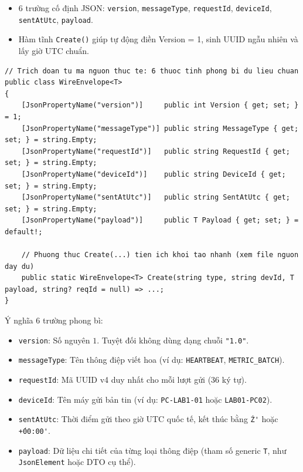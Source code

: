 \documentclass[12pt,a4paper]{article}
\begin{document}
\begin{orientationbox}
\begin{itemize}[leftmargin=1.5em, itemsep=1pt]
  \item 6 trường cố định JSON: \texttt{version}, \texttt{messageType}, \texttt{requestId}, \texttt{deviceId}, \texttt{sentAtUtc}, \texttt{payload}.
  \item Hàm tĩnh \texttt{Create()} giúp tự động điền Version = 1, sinh UUID ngẫu nhiên và lấy giờ UTC chuẩn.
\end{itemize}
\end{orientationbox}

\begin{lstlisting}[language=CSharp, caption={Ví dụ rút gọn dựa trên mã nguồn hiện tại: src/LabGuard.Protocol/WireEnvelope.cs}]
// Trich doan tu ma nguon thuc te: 6 thuoc tinh phong bi du lieu chuan
public class WireEnvelope<T>
{
    [JsonPropertyName("version")]     public int Version { get; set; } = 1;
    [JsonPropertyName("messageType")] public string MessageType { get; set; } = string.Empty;
    [JsonPropertyName("requestId")]   public string RequestId { get; set; } = string.Empty;
    [JsonPropertyName("deviceId")]    public string DeviceId { get; set; } = string.Empty;
    [JsonPropertyName("sentAtUtc")]   public string SentAtUtc { get; set; } = string.Empty;
    [JsonPropertyName("payload")]     public T Payload { get; set; } = default!;

    // Phuong thuc Create(...) tien ich khoi tao nhanh (xem file nguon day du)
    public static WireEnvelope<T> Create(string type, string devId, T payload, string? reqId = null) => ...;
}
\end{lstlisting}

Ý nghĩa 6 trường phong bì:
\begin{itemize}
  \item \texttt{version}: Số nguyên $1$. Tuyệt đối không dùng dạng chuỗi \texttt{"1.0"}.
  \item \texttt{messageType}: Tên thông điệp viết hoa (ví dụ: \texttt{HEARTBEAT}, \texttt{METRIC\_BATCH}).
  \item \texttt{requestId}: Mã UUID v4 duy nhất cho mỗi lượt gửi (36 ký tự).
  \item \texttt{deviceId}: Tên máy gửi bản tin (ví dụ: \texttt{PC-LAB1-01} hoặc \texttt{LAB01-PC02}).
  \item \texttt{sentAtUtc}: Thời điểm gửi theo giờ UTC quốc tế, kết thúc bằng \texttt{\'Z\'} hoặc \texttt{\'+00:00\'}.
  \item \texttt{payload}: Dữ liệu chi tiết của từng loại thông điệp (tham số generic \texttt{T}, như \texttt{JsonElement} hoặc DTO cụ thể).
\end{itemize}
\end{document}
